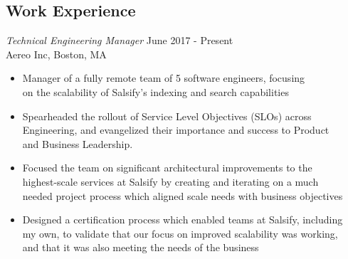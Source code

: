 \documentclass[line,margin]{res}
\begin{document}
\address{399 Pleasant St, Canton MA, 02021}
\address{(563) 581-8229\\ \href{mailto:eric.d.brown23@gmail.com}{eric.d.brown23@gmail.com}}

    \begin{resume}
        \section{Work Experience}
            {\sl Technical Engineering Manager} \hfill June 2017 - Present \\
            Aereo Inc, Boston, MA
                \begin{itemize} \itemsep -2pt %
                    \item Manager of a fully remote team of 5 software engineers, focusing \\
                          on the scalability of Salsify's indexing and search capabilities
                    \item Spearheaded the rollout of Service Level Objectives (SLOs) across \\
                          Engineering, and evangelized their importance and success to Product \\
                          and Business Leadership.
                    \item Focused the team on significant architectural improvements to the \\
                          highest-scale services at Salsify by creating and iterating on a much \\
                          needed project process which aligned scale needs with business objectives
                    \item Designed a certification process which enabled teams at Salsify, including \\
                          my own, to validate that our focus on improved scalability was working, \\
                          and that it was also meeting the needs of the business
                \end{itemize}


\end{resume}
\end{document}
